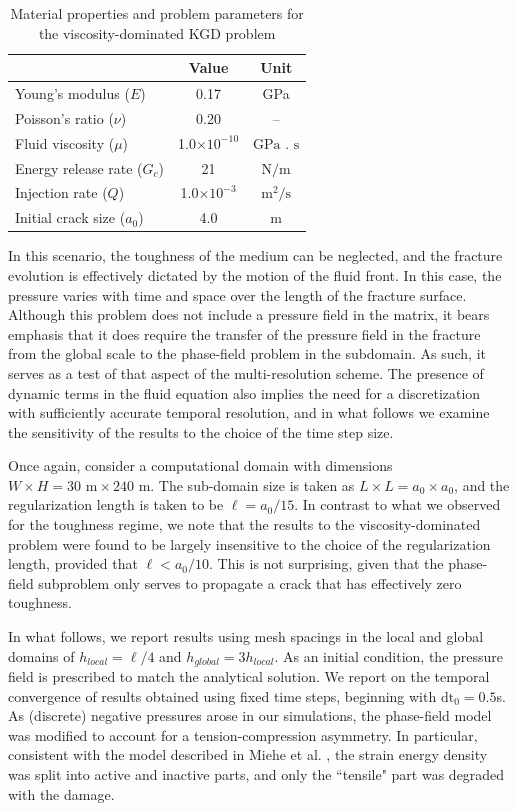 \begin{table}[ht]
\centering
\caption{Material properties and problem parameters for the viscosity-dominated KGD problem}
\begin{tabular}[t]{lcc}
\hline
&Value &Unit \\
\hline
Young's modulus ($E$)&0.17&GPa\\
Poisson's ratio ($\nu$)&0.20&--\\
Fluid viscosity ($\mu$)&1.0$\times10^{-10}$&$\text{GPa . s}$\\
Energy release rate ($G_c$)&21&$\text{N/m}$\\
Injection rate ($Q$)&1.0$\times10^{-3}$&$\text{m}^2/\text{s}$\\
Initial crack size ($a_0$) &4.0&$\text{m}$\\
\hline
\end{tabular}
\label{parameters_vKGD}
\end{table}%

In this scenario, the toughness of the medium can be neglected, and the fracture evolution is effectively dictated by the motion of the fluid front.  In this case, the pressure varies with time and space over the length of the fracture surface.   Although this problem does not include a pressure field in the matrix,  it bears emphasis that it does require the transfer of the pressure field in the fracture from the global scale to the phase-field problem in the subdomain.  As such, it serves as a test of that aspect of the multi-resolution scheme. The presence of dynamic terms in the fluid equation also implies the need for a discretization with sufficiently accurate temporal resolution, and in what follows we examine the sensitivity of the results to the choice of the time step size.  

Once again, consider a computational domain with dimensions $W\times H = 30\text{ m} \times 240\text{ m}$.  The sub-domain size is taken as $L \times L = a_0 \times a_0$, and the regularization length is taken to be $\ell = a_0/15$.  In contrast to what we observed for the toughness regime, we note that the results to the viscosity-dominated problem were found to be largely insensitive to the choice of the regularization length, provided that $\ell < a_0/10$.  This is not surprising, given that the phase-field subproblem only serves to propagate a crack that has effectively zero toughness.

In what follows, we report results using mesh spacings in the local and global domains of $h_{local} = \ell/{4}$ and $h_{global} = 3h_{local}$.  As an initial condition, the pressure field is prescribed to match the analytical solution. We report on the temporal convergence of results obtained using fixed time steps, beginning with $\text{dt}_0 = 0.5$s.  As (discrete) negative pressures arose in our simulations, the phase-field model was modified to account for a tension-compression asymmetry.  In particular, consistent with the model described in Miehe et al. \cite{miehe2010phase}, the strain energy density was split into active and inactive parts, and only the ``tensile" part was degraded with the damage.  

